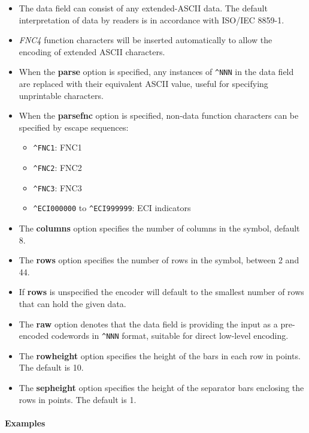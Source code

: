 \begin{itemize}
\tightlist
\item
  The data field can consist of any extended-ASCII data. The default
  interpretation of data by readers is in accordance with ISO/IEC
  8859-1.
\item
  \emph{FNC4} function characters will be inserted automatically to
  allow the encoding of extended ASCII characters.
\item
  When the \textbf{parse} option is specified, any instances of
  \texttt{\^{}NNN} in the data field are replaced with their equivalent
  ASCII value, useful for specifying unprintable characters.
\item
  When the \textbf{parsefnc} option is specified, non-data function
  characters can be specified by escape sequences:

  \begin{itemize}
  \tightlist
  \item
    \texttt{\^{}FNC1}: FNC1
  \item
    \texttt{\^{}FNC2}: FNC2
  \item
    \texttt{\^{}FNC3}: FNC3
  \item
    \texttt{\^{}ECI000000} to \texttt{\^{}ECI999999}: ECI indicators
  \end{itemize}
\item
  The \textbf{columns} option specifies the number of columns in the
  symbol, default 8.
\item
  The \textbf{rows} option specifies the number of rows in the symbol,
  between 2 and 44.
\item
  If \textbf{rows} is unspecified the encoder will default to the
  smallest number of rows that can hold the given data.
\item
  The \textbf{raw} option denotes that the data field is providing the
  input as a pre-encoded codewords in \texttt{\^{}NNN} format, suitable
  for direct low-level encoding.
\item
  The \textbf{rowheight} option specifies the height of the bars in each
  row in points. The default is 10.
\item
  The \textbf{sepheight} option specifies the height of the separator
  bars enclosing the rows in points. The default is 1.
\end{itemize}

\hypertarget{examples-40}{%
\paragraph{Examples}\label{examples-40}}

